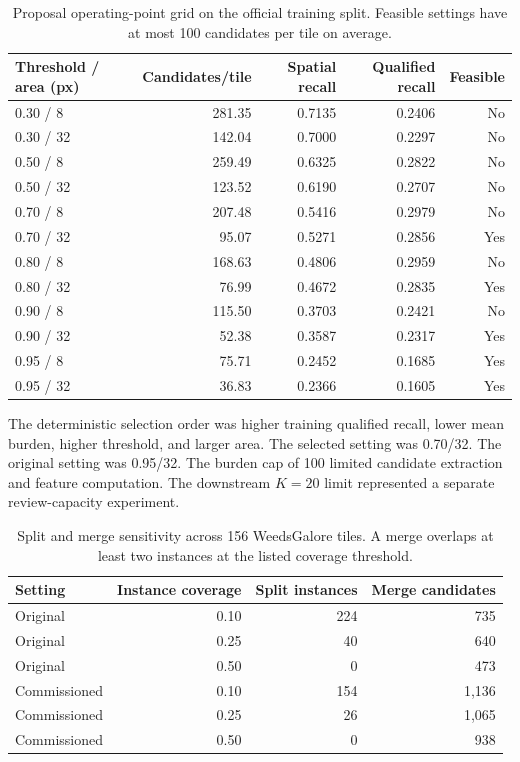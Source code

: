 \documentclass[preprint,12pt]{elsarticle}
\begin{document}
\begin{table}[htbp]
\centering
\caption{Proposal operating-point grid on the official training split. Feasible settings have at most 100 candidates per tile on average.}
\label{tab:s4grid}
\footnotesize
\setlength{\tabcolsep}{4pt}
\begin{tabular}{lrrrr}
\toprule
Threshold / area (px) & Candidates/tile & Spatial recall & Qualified recall & Feasible \\
\midrule
0.30 / 8 & 281.35 & 0.7135 & 0.2406 & No \\
0.30 / 32 & 142.04 & 0.7000 & 0.2297 & No \\
0.50 / 8 & 259.49 & 0.6325 & 0.2822 & No \\
0.50 / 32 & 123.52 & 0.6190 & 0.2707 & No \\
0.70 / 8 & 207.48 & 0.5416 & 0.2979 & No \\
0.70 / 32 & 95.07 & 0.5271 & 0.2856 & Yes \\
0.80 / 8 & 168.63 & 0.4806 & 0.2959 & No \\
0.80 / 32 & 76.99 & 0.4672 & 0.2835 & Yes \\
0.90 / 8 & 115.50 & 0.3703 & 0.2421 & No \\
0.90 / 32 & 52.38 & 0.3587 & 0.2317 & Yes \\
0.95 / 8 & 75.71 & 0.2452 & 0.1685 & Yes \\
0.95 / 32 & 36.83 & 0.2366 & 0.1605 & Yes \\
\bottomrule
\end{tabular}
\end{table}

The deterministic selection order was higher training qualified recall, lower mean burden, higher threshold, and larger area. The selected setting was 0.70/32. The original setting was 0.95/32. The burden cap of 100 limited candidate extraction and feature computation. The downstream $K=20$ limit represented a separate review-capacity experiment.

\begin{table}[htbp]
\centering
\caption{Split and merge sensitivity across 156 WeedsGalore tiles. A merge overlaps at least two instances at the listed coverage threshold.}
\label{tab:s4splitmerge}
\small
\begin{tabular}{lrrr}
\toprule
Setting & Instance coverage & Split instances & Merge candidates \\
\midrule
Original & 0.10 & 224 & 735 \\
Original & 0.25 & 40 & 640 \\
Original & 0.50 & 0 & 473 \\
Commissioned & 0.10 & 154 & 1,136 \\
Commissioned & 0.25 & 26 & 1,065 \\
Commissioned & 0.50 & 0 & 938 \\
\bottomrule
\end{tabular}
\end{table}
\end{document}
